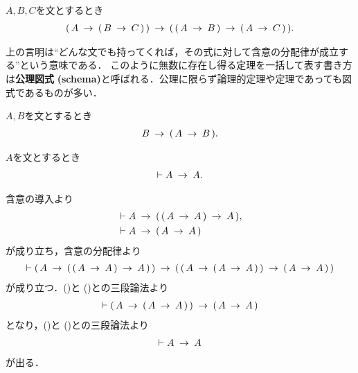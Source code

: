 	\begin{screen}
		\begin{logicalaxm}[含意の分配律]
		\label{logicalaxm:distributive_law_of_implication}
			$A,B,C$を文とするとき
			\begin{align}
				(\, A \hspace{0.25em}\rightarrow\hspace{0.25em} (\, B \hspace{0.25em}\rightarrow\hspace{0.25em} C\, )\, ) 
				\hspace{0.25em}\rightarrow\hspace{0.25em} (\, (\, A \hspace{0.25em}\rightarrow\hspace{0.25em} B\, ) \hspace{0.25em}\rightarrow\hspace{0.25em} (\, A \hspace{0.25em}\rightarrow\hspace{0.25em} C\, )\, ).
			\end{align}
		\end{logicalaxm}
	\end{screen}
	
	上の言明は``どんな文でも持ってくれば，その式に対して含意の分配律が成立する''という意味である．
	このように無数に存在し得る定理を一括して表す書き方は{\bf 公理図式}\index{こうりずしき@公理図式}
	{\bf (schema)}と呼ばれる．公理に限らず論理的定理や定理であっても図式であるものが多い．
	
	\begin{screen}
		\begin{logicalaxm}[含意の導入]
		\label{logicalaxm:introduction_of_implication}
			$A,B$を文とするとき
			\begin{align}
				B \hspace{0.25em}\rightarrow\hspace{0.25em} (\, A \hspace{0.25em}\rightarrow\hspace{0.25em} B\, ).
			\end{align}
		\end{logicalaxm}
	\end{screen}
	
	\begin{screen}
		\begin{logicalthm}[含意の反射律]
		\label{logicalthm:reflective_law_of_implication}
			$A$を文とするとき
			\begin{align}
				\vdash A \hspace{0.25em}\rightarrow\hspace{0.25em} A.
			\end{align}
		\end{logicalthm}
	\end{screen}
	
	\begin{prf}
		含意の導入より
		\begin{align}
			&\vdash A \rarrow (\, (\, A \rarrow A\, ) \rarrow A\, ), 
			\label{fom:reflective_law_of_implication_1} \\
			&\vdash A \rarrow (\, A \rarrow A\, )
			\label{fom:reflective_law_of_implication_2}
		\end{align}
		が成り立ち，含意の分配律より
		\begin{align}
			\vdash (\, A \rarrow (\, (\, A \rarrow A\, ) \rarrow A\, )\, )
				\rarrow (\, (\, A \rarrow (\, A \rarrow A\, )\, )
				\rarrow (\, A \rarrow A\, )\, )
				\label{fom:reflective_law_of_implication_3}
		\end{align}
		が成り立つ．()と
		()との三段論法より
		\begin{align}
			\vdash (\, A \rarrow (\, A \rarrow A\, )\, )
				\rarrow (\, A \rarrow A\, )
			\label{fom:reflective_law_of_implication_4}
		\end{align}
		となり，()と
		()との三段論法より
		\begin{align}
			\vdash A \hspace{0.25em}\rightarrow\hspace{0.25em} A
		\end{align}
		が出る．
		\QED
	\end{prf}
	
